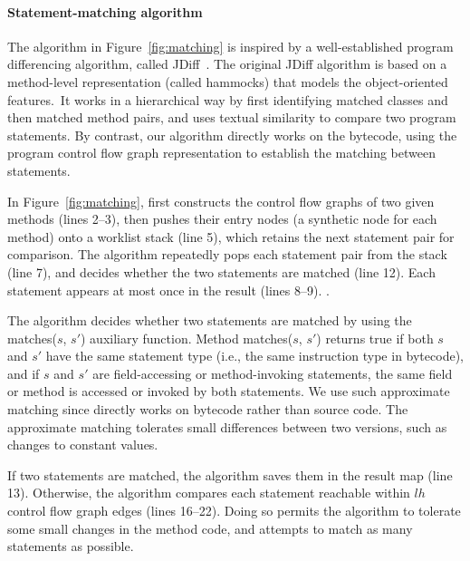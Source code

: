\paragraph{Statement-matching algorithm}

The algorithm in Figure~\ref{fig:matching} is inspired by
a well-established program differencing algorithm, called
JDiff~\cite{Apiwattanapong:2004}. The original JDiff
algorithm is based on a method-level representation
(called hammocks) that models the object-oriented features.\
It works in a hierarchical way by first identifying matched
classes and then matched method pairs, and uses
textual similarity to compare two program statements. By contrast, our
algorithm directly works on the bytecode, using the program control flow graph
representation to establish the matching between statements.

In Figure~\ref{fig:matching}, \ourtool first constructs the control
flow graphs of two given methods (lines 2--3), then pushes their
entry nodes (a synthetic node for each method) onto a worklist stack (line 5), which retains
the next statement pair for comparison. The algorithm repeatedly
pops each statement pair from the stack (line 7), and
decides whether the two statements are matched (line 12).  
Each statement appears at most once in the result (lines 8--9). .

The algorithm decides whether two statements are matched by using
the matches($\mathit{s}$, $\mathit{s'}$) auxiliary function. Method
matches($\mathit{s}$, $\mathit{s'}$) returns true if both
$\mathit{s}$ and $\mathit{s'}$ have the same statement type (i.e.,
the same instruction type in bytecode), and if $\mathit{s}$ and
$\mathit{s'}$ are field-accessing or method-invoking statements,
the same field or method is accessed or invoked
by both statements.
We use such approximate matching since \ourtool directly works
on bytecode rather than source code. The approximate matching
tolerates small differences
between two versions, such as changes to constant values.


If two statements are matched, the algorithm saves them in the
result map (line 13). Otherwise,
the algorithm compares each statement reachable within $lh$
control flow graph edges (lines 16--22). Doing so permits the algorithm to tolerate some small
changes in the method code, and attempts to match as many statements as possible.

